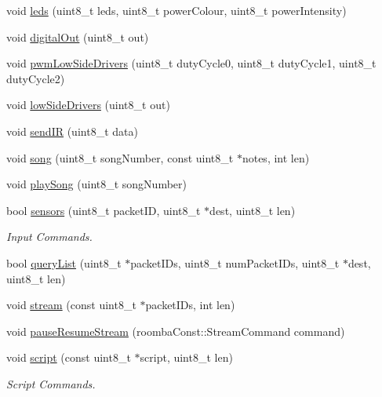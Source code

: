 \begin{DoxyCompactItemize}
\item 
void \hyperlink{class_arduino_roomba_a03c310c1247df2636d236bb633529fc3}{leds} (uint8\_\-t leds, uint8\_\-t powerColour, uint8\_\-t powerIntensity)
\item 
void \hyperlink{class_arduino_roomba_af9adb4ea958dc11adcdbb89c394f0ccc}{digitalOut} (uint8\_\-t out)
\item 
void \hyperlink{class_arduino_roomba_a5be9ba9927edecc77905c92771d7a483}{pwmLowSideDrivers} (uint8\_\-t dutyCycle0, uint8\_\-t dutyCycle1, uint8\_\-t dutyCycle2)
\item 
void \hyperlink{class_arduino_roomba_ae9f66b6d0eb850b4bcae3aeaa9b092e2}{lowSideDrivers} (uint8\_\-t out)
\item 
void \hyperlink{class_arduino_roomba_a268d068b9c0253f237165de1bbbc11df}{sendIR} (uint8\_\-t data)
\item 
void \hyperlink{class_arduino_roomba_aef389c1f20272d988463227a3014dd03}{song} (uint8\_\-t songNumber, const uint8\_\-t $\ast$notes, int len)
\item 
void \hyperlink{class_arduino_roomba_a8c89574185bae1b51e96aa79ce2790ed}{playSong} (uint8\_\-t songNumber)
\item 
bool \hyperlink{class_arduino_roomba_a4f4e7139b7cd0ec2ddbb09d18e8a8f08}{sensors} (uint8\_\-t packetID, uint8\_\-t $\ast$dest, uint8\_\-t len)
\begin{DoxyCompactList}\small\item\em Input Commands. \item\end{DoxyCompactList}\item 
bool \hyperlink{class_arduino_roomba_a44be486f377bec58f83bfebc4791f298}{queryList} (uint8\_\-t $\ast$packetIDs, uint8\_\-t numPacketIDs, uint8\_\-t $\ast$dest, uint8\_\-t len)
\item 
void \hyperlink{class_arduino_roomba_a687c72eb69928dba45aa53aa39af2f1f}{stream} (const uint8\_\-t $\ast$packetIDs, int len)
\item 
void \hyperlink{class_arduino_roomba_a9563d94e22335c334cdc0791b4c5b1cf}{pauseResumeStream} (roombaConst::StreamCommand command)
\item 
void \hyperlink{class_arduino_roomba_a4d8122739d5e828f963f6e51ee4d101a}{script} (const uint8\_\-t $\ast$script, uint8\_\-t len)
\begin{DoxyCompactList}\small\item\em Script Commands. \item\end{DoxyCompactList}\item 

\end{DoxyCompactItemize}
